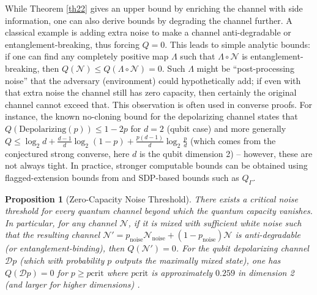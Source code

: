 \documentclass[11pt]{article}
\theoremstyle{plain}
\newtheorem{proposition}[theorem]{Proposition}
\theoremstyle{definition}
\numberwithin{equation}{section}
\begin{document}
While Theorem \ref{th22} gives an upper bound by enriching the channel with side information, one can also derive bounds by degrading the channel further. A classical example is adding extra noise to make a channel anti-degradable or entanglement-breaking, thus forcing $Q=0$. This leads to simple analytic bounds: if one can find any completely positive map $\Lambda$ such that $\Lambda\circ \mathcal{N}$ is entanglement-breaking, then $Q(\mathcal{N}) \le Q(\Lambda\circ\mathcal{N}) = 0$. Such $\Lambda$ might be “post-processing noise” that the adversary (environment) could hypothetically add; if even with that extra noise the channel still has zero capacity, then certainly the original channel cannot exceed that. This observation is often used in converse proofs. For instance, the known no-cloning bound for the depolarizing channel states that $Q(\text{Depolarizing}(p)) \le 1-2p$ for $d=2$ (qubit case) and more generally $Q \le \log_2 d + \frac{d-1}{d}\log_2(1-p) + \frac{p(d-1)}{d}\log_2 \frac{p}{d}$ (which comes from the conjectured strong converse, here $d$ is the qubit dimension 2) – however, these are not always tight. In practice, stronger computable bounds can be obtained using flagged-extension bounds from \cite{FKG20,KFG22} and SDP-based bounds such as $Q_\Gamma$.


\begin{proposition}[Zero-Capacity Noise Threshold]\label{pp11}
There exists a critical noise threshold for every quantum channel beyond which the quantum capacity vanishes. In particular, for any channel $\mathcal{N}$, if it is mixed with sufficient white noise such that the resulting channel $\mathcal{N}' = p_{\text{noise}}\mathcal{N}_{\text{noise}} + (1-p_{\text{noise}})\mathcal{N}$ is anti-degradable (or entanglement-binding), then $Q(\mathcal{N}')=0$. For the qubit depolarizing channel $\mathcal{D}p$ (which with probability $p$ outputs the maximally mixed state), one has $Q(\mathcal{D}p)=0$ for $p \ge p{\text{crit}}$ where $p{\text{crit}}$ is approximately $0.259$ in dimension 2 (and larger for higher dimensions) \cite{11}.
\end{proposition}
\end{document}
